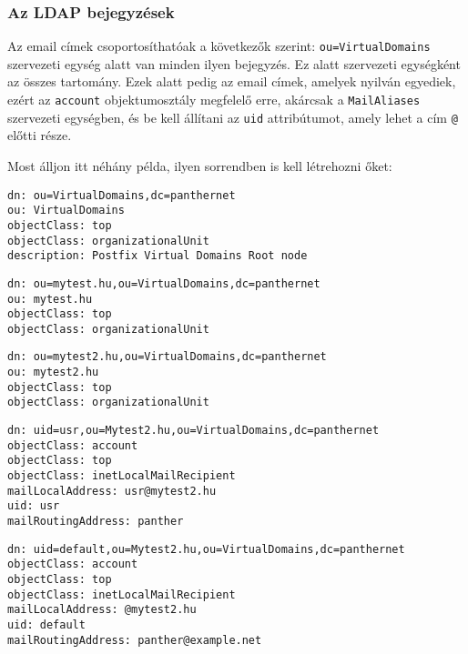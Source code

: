 \subsubsection{Az LDAP bejegyzések}

Az email címek csoportosíthatóak a következők szerint: \texttt{ou=VirtualDomains} szervezeti egység alatt van minden
ilyen bejegyzés. Ez alatt szervezeti egységként az összes tartomány. Ezek alatt pedig az email címek, amelyek nyilván
egyediek, ezért az \texttt{account} objektumosztály megfelelő erre, akárcsak a \texttt{MailAliases} szervezeti
egységben, és be kell állítani az \texttt{uid} attribútumot, amely lehet a cím \texttt{@} előtti része.

Most álljon itt néhány példa, ilyen sorrendben is kell létrehozni őket:


\begin{Verbatim}[frame=single,label=VirtualDomains]
dn: ou=VirtualDomains,dc=panthernet
ou: VirtualDomains
objectClass: top
objectClass: organizationalUnit
description: Postfix Virtual Domains Root node
\end{Verbatim}


\begin{Verbatim}[frame=single,label=mytest.hu]
dn: ou=mytest.hu,ou=VirtualDomains,dc=panthernet
ou: mytest.hu
objectClass: top
objectClass: organizationalUnit
\end{Verbatim}


\begin{Verbatim}[frame=single,label=mytest2.hu]
dn: ou=mytest2.hu,ou=VirtualDomains,dc=panthernet
ou: mytest2.hu
objectClass: top
objectClass: organizationalUnit

\end{Verbatim}

\begin{Verbatim}[frame=single,label=usr@mytest2.hu]
dn: uid=usr,ou=Mytest2.hu,ou=VirtualDomains,dc=panthernet
objectClass: account
objectClass: top
objectClass: inetLocalMailRecipient
mailLocalAddress: usr@mytest2.hu
uid: usr
mailRoutingAddress: panther
\end{Verbatim}

\begin{Verbatim}[frame=single,label=default]
dn: uid=default,ou=Mytest2.hu,ou=VirtualDomains,dc=panthernet
objectClass: account
objectClass: top
objectClass: inetLocalMailRecipient
mailLocalAddress: @mytest2.hu
uid: default
mailRoutingAddress: panther@example.net
\end{Verbatim}

